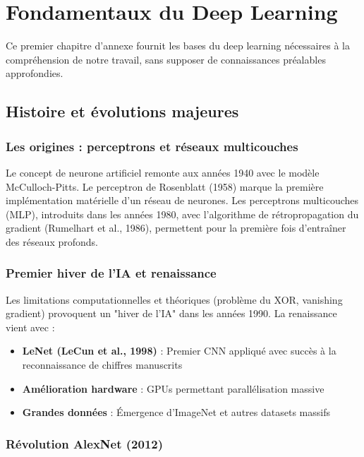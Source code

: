 
\chapter{Fondamentaux du Deep Learning}

Ce premier chapitre d'annexe fournit les bases du deep learning nécessaires à la compréhension de notre travail, sans supposer de connaissances préalables approfondies.

\section{Histoire et évolutions majeures}

\subsection{Les origines : perceptrons et réseaux multicouches}

Le concept de neurone artificiel remonte aux années 1940 avec le modèle McCulloch-Pitts. Le perceptron de Rosenblatt (1958) marque la première implémentation matérielle d'un réseau de neurones. Les perceptrons multicouches (MLP), introduits dans les années 1980, avec l'algorithme de rétropropagation du gradient (Rumelhart et al., 1986), permettent pour la première fois d'entraîner des réseaux profonds.

\subsection{Premier hiver de l'IA et renaissance}

Les limitations computationnelles et théoriques (problème du XOR, vanishing gradient) provoquent un "hiver de l'IA" dans les années 1990. La renaissance vient avec :
\begin{itemize}
    \item \textbf{LeNet (LeCun et al., 1998)} : Premier CNN appliqué avec succès à la reconnaissance de chiffres manuscrits
    \item \textbf{Amélioration hardware} : GPUs permettant parallélisation massive
    \item \textbf{Grandes données} : Émergence d'ImageNet et autres datasets massifs
\end{itemize}

\subsection{Révolution AlexNet (2012)}

